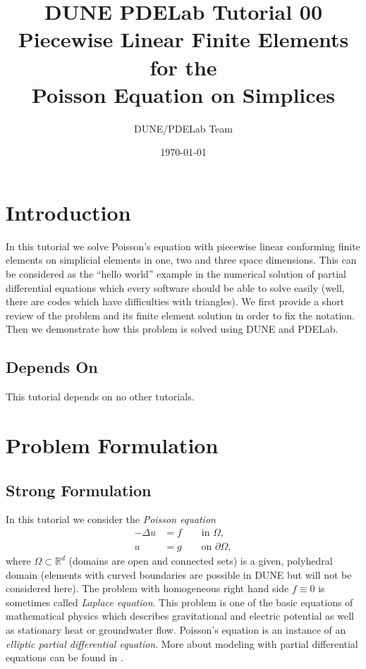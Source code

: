 \documentclass[a4paper,12pt]{article}
\title{DUNE PDELab Tutorial 00 \\ 
Piecewise Linear Finite Elements for the\\
Poisson Equation on Simplices}
\author{DUNE/PDELab Team}
\date{\today}
\begin{document}
\maketitle
\tableofcontents
\clearpage

\section{Introduction}

In this tutorial we solve Poisson's equation with piecewise linear conforming 
finite elements on simplicial elements in one, two and three space dimensions. 
This can be considered as the ``hello world''
example in the numerical solution of partial differential equations which
every software should be able to solve easily (well, there are codes which have
difficulties with triangles). We first provide a short review of the problem and
its finite element solution in order to fix the notation. Then we demonstrate
how this problem is solved using DUNE and PDELab.

\subsection*{Depends On} This tutorial depends on no other tutorials.

\section{Problem Formulation}

\subsection{Strong Formulation}

In this tutorial we consider the {\em Poisson equation}
\begin{subequations}
\begin{align}
-\Delta u & = f \qquad\text{in $\Omega$},\label{eq:1a}\\
u &= g \qquad\text{on $\partial\Omega$},\label{eq:1b}
\end{align}
\end{subequations}
where $\Omega\subset\mathbb{R}^d$ (domains are open and connected sets)
is a given, polyhedral domain (elements with curved
boundaries are possible in DUNE but will not be considered here). 
The problem with homogeneous right hand side $f\equiv 0$ is sometimes called
{\em Laplace equation}. This problem 
is one of the basic equations of mathematical physics which describes gravitational
and electric potential as well as stationary heat or groundwater flow.
Poisson's equation is an instance of an {\em elliptic partial differential equation}.
More about modeling with partial differential equations can be found in \cite{Eriksson,BastianII}.
\end{document}
